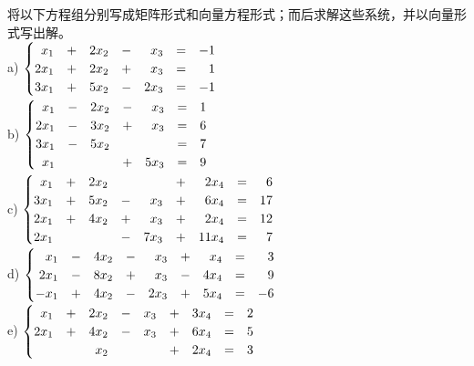 \begin{problemset}
\item \label{ex:02-02-01} 将以下方程组分别写成矩阵形式和向量方程形式；而后求解这些系统，并以向量形式写出解。\\
a) $\begin{cases} \begin{array}{@{}rcrcrcr@{}} x_1 & + & 2x_2 & - & x_3 & = & -1 \\ 2x_1 & + & 2x_2 & + & x_3 & = & 1 \\ 3x_1 & + & 5x_2 & - & 2x_3 & = & -1 \end{array} \end{cases}$
\\
b) $\begin{cases} \begin{array}{@{}rcrcrcr@{}} x_1 & - & 2x_2 & - & x_3 & = & 1 \\ 2x_1 & - & 3x_2 & + & x_3 & = & 6 \\ 3x_1 & - & 5x_2 & & & = & 7 \\ x_1 & & & + & 5x_3 & = & 9 \end{array} \end{cases}$
\\
c) $\begin{cases} \begin{array}{@{}rcrcrcrcr@{}} x_1 & + & 2x_2 & & & + & 2x_4 & = & 6 \\ 3x_1 & + & 5x_2 & - & x_3 & + & 6x_4 & = & 17 \\ 2x_1 & + & 4x_2 & + & x_3 & + & 2x_4 & = & 12 \\ 2x_1 & & & - & 7x_3 & + & 11x_4 & = & 7 \end{array} \end{cases}$
\\
d) $\begin{cases} \begin{array}{@{}rcrcrcrcr@{}} x_1 & - & 4x_2 & - & x_3 & + & x_4 & = & 3 \\ 2x_1 & - & 8x_2 & + & x_3 & - & 4x_4 & = & 9 \\ -x_1 & + & 4x_2 & - & 2x_3 & + & 5x_4 & = & -6 \end{array} \end{cases}$
\\
e) $\begin{cases} \begin{array}{@{}rcrcrcrcr@{}} x_1 & + & 2x_2 & - & x_3 & + & 3x_4 & = & 2 \\ 2x_1 & + & 4x_2 & - & x_3 & + & 6x_4 & = & 5 \\ & & x_2 & & & + & 2x_4 & = & 3 \end{array} \end{cases}$

\end{problemset}
